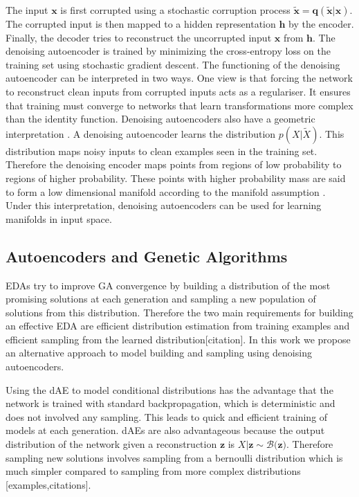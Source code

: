 \documentclass[runningheads,a4paper]{llncs}
\begin{document}
The input $\mathbf x$ is first corrupted using a stochastic corruption process $\mathbf{\tilde x = q(\tilde x|x)}$. The corrupted input is then mapped to a hidden representation $\mathbf h$ by the encoder. Finally, the decoder tries to reconstruct the uncorrupted input $\mathbf x$ from $\mathbf h$. The denoising autoencoder is trained by minimizing the cross-entropy loss on the training set using stochastic gradient descent. The functioning of the denoising autoencoder can be interpreted in two ways. One view is that forcing the network to reconstruct clean inputs from corrupted inputs acts as a regulariser. It ensures that training must converge to networks that learn transformations more complex than the identity function. Denoising autoencoders also have a geometric interpretation \cite{vincent2010stacked}. A denoising autoencoder learns the distribution $p(X|\tilde X)$. This distribution maps noisy inputs to clean examples seen in the training set. Therefore the denoising encoder maps points from regions of low probability to regions of higher probability. These points with higher probability mass are said to form a low dimensional manifold according to the manifold assumption \cite{chapelle2006semi}. Under this interpretation, denoising autoencoders can be used for learning manifolds in input space.

\subsection{Autoencoders and Genetic Algorithms}
EDAs try to improve GA convergence by building a distribution of the most promising solutions at each generation and sampling a new population of solutions from this distribution. Therefore the two main requirements for building an effective EDA are efficient distribution estimation from training examples and efficient sampling from the learned distribution[citation]. In this work we propose an alternative approach to model building and sampling using denoising autoencoders. 

Using the dAE to model conditional distributions has the advantage that the network is trained with standard backpropagation, which is deterministic and does not involved any sampling. This leads to quick and efficient training of models at each generation. dAEs are also advantageous because the output distribution of the network given a reconstruction $ \mathbf z$ is  $X|\mathbf{z} \sim \mathcal{B(\mathbf{z}})$. Therefore sampling new solutions involves sampling from a bernoulli distribution which is much simpler compared to sampling from more complex distributions [examples,citations]. 
\end{document}

